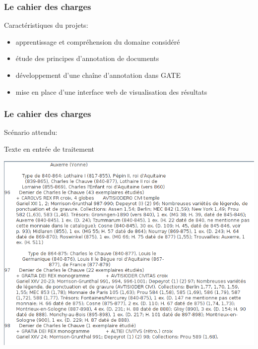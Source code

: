 \documentclass[10pt, compress]{beamer}
\begin{document}
\begin{frame}[fragile]
	\frametitle{Le cahier des charges}
	Caractéristiques du projets:\\
	\begin{itemize}[<+->]
	[square]
		\item{apprentissage et compréhension du domaine considéré}
		\item{étude des principes d'annotation de documents}
		\item{développement d'une chaîne d'annotation dans GATE}
		\item{mise en place d'une interface web de visualisation des résultats}
	\end{itemize}
\end{frame}

\begin{frame}[fragile]
	\frametitle{Le cahier des charges}
	Scénario attendu:
	\begin{scriptsize}
	Texte en entrée de traitement
	\end{scriptsize}
	\includegraphics[scale=0.3]{img/beforean.png}
\end{frame}
\end{document}
